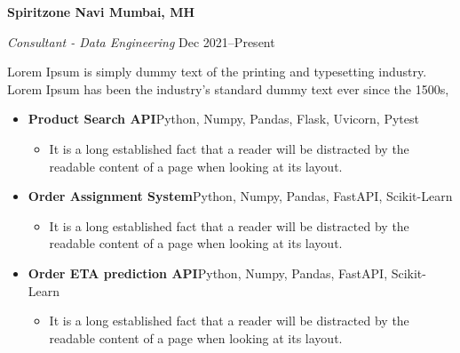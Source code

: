 \textbf{Spiritzone \hfill Navi Mumbai, MH}\par

\textit{Consultant - Data Engineering} \hfill Dec 2021--Present

Lorem Ipsum is simply dummy text of the printing and typesetting industry. Lorem Ipsum has been the industry's standard dummy text ever since the 1500s,
\begin{itemize}
	\item \textbf{Product Search API}\hfill Python, Numpy, Pandas, Flask, Uvicorn, Pytest
	\begin{itemize}
		\item It is a long established fact that a reader will be distracted by the readable content of a page when looking at its layout.
	\end{itemize}
	
	\item \textbf{Order Assignment System}\hfill Python, Numpy, Pandas, FastAPI, Scikit-Learn
	\begin{itemize}
		\item It is a long established fact that a reader will be distracted by the readable content of a page when looking at its layout.
	\end{itemize}
	
	\item \textbf{Order ETA prediction API}\hfill Python, Numpy, Pandas, FastAPI, Scikit-Learn
	\begin{itemize}
		\item It is a long established fact that a reader will be distracted by the readable content of a page when looking at its layout.
	\end{itemize}
\end{itemize}\par
